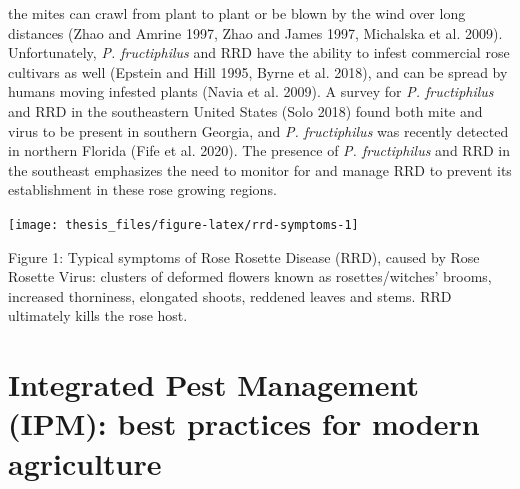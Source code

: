 \documentclass[12pt,final,CPage]{ufthesis}
\begin{document}
{the mites can crawl from plant to plant or be blown by the wind over long distances (Zhao and Amrine 1997, Zhao and James 1997, Michalska et al. 2009). Unfortunately, \emph{P. fructiphilus} and RRD have the ability to infest commercial rose cultivars as well (Epstein and Hill 1995, Byrne et al. 2018), and can be spread by humans moving infested plants (Navia et al. 2009). A survey for \emph{P. fructiphilus} and RRD in the southeastern United States (Solo 2018) found both mite and virus to be present in southern Georgia, and \emph{P. fructiphilus} was recently detected in northern Florida (Fife et al. 2020).
  The presence of \emph{P. fructiphilus} and RRD in the southeast emphasizes the need to monitor for and manage RRD to prevent its establishment in these rose growing regions.
  \begin{center}\texttt{[image: thesis\_files/figure-latex/rrd-symptoms-1]} \end{center}

  Figure 1: Typical symptoms of Rose Rosette Disease (RRD), caused by Rose Rosette Virus: clusters of deformed flowers known as rosettes/witches' brooms, increased thorniness, elongated shoots, reddened leaves and stems. RRD ultimately kills the rose host.

  \hypertarget{ipm-litrev}{%
  \section{Integrated Pest Management (IPM): best practices for modern agriculture}\label{ipm-litrev}}

}
\end{document}
